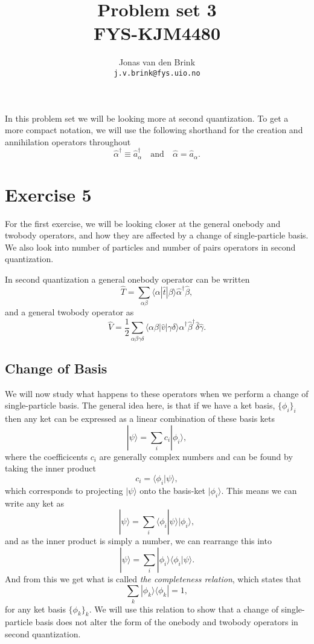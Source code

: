 \documentclass[a4paper, 11pt, notitlepage, english]{article}
\author{Jonas van den Brink \\ \texttt{j.v.brink@fys.uio.no}}
\title{Problem set 3 \\ FYS-KJM4480}
\newcommand{\bra}[1]{\langle #1|}
\newcommand{\ket}[1]{|#1 \rangle}
\newcommand{\braket}[2]{\langle #1 | #2 \rangle}
\newcommand{\op}[1]{\hat{#1}}
\newcommand{\braopket}[3]{\langle #1 | {#2} | #3 \rangle}
\newcommand{\ketbra}[2]{\ket{#1}\bra{#2}}
\begin{document}
\maketitle

In this problem set we will be looking more at second quantization. To get a more compact notation, we will use the following shorthand for the creation and annihilation operators throughout
$$\op{\alpha}^\dag \equiv \op{a}_\alpha^\dag \quad \mbox{and} \quad \op{\alpha} = \op{a}_\alpha.$$

\section*{Exercise 5}
For the first exercise, we will be looking closer at the general onebody and twobody operators, and how they are affected by a change of single-particle basis. We also look into number of particles and number of pairs operators in second quantization.

In second quantization a general onebody operator can be written
$$\op{T} = \sum_{\alpha\beta} \braopket{\alpha}{\op{t}}{\beta} \op{\alpha}^\dag \op{\beta},$$
and a general twobody operator as
$$\op{V} = \frac{1}{2}\sum_{\alpha\beta\gamma\delta} \braopket{\alpha\beta}{\op{v}}{\gamma\delta} \op{\alpha}^\dag \op{\beta}^\dag \op{\delta} \op{\gamma}.$$

\subsection*{Change of Basis}
We will now study what happens to these operators when we perform a change of single-particle basis. The general idea here, is that if we have a ket basis, $\{\phi_i\}_i$ then any ket can be expressed as a linear combination of these basis kets
$$\ket{\psi} = \sum_i c_i \ket{\phi_i},$$
where the coefficicents $c_i$ are generally complex numbers and can be found by taking the inner product 
$$c_i = \braket{\phi_i}{\psi},$$
which corresponds to projecting $\ket{\psi}$ onto the basis-ket $\ket{\phi_i}$. This means we can write any ket as
$$\ket{\psi} = \sum_i  \braket{\phi_i}{\psi}\ket{\phi_i},$$
and as the inner product is simply a number, we can rearrange this into
$$\ket{\psi} = \sum_i  \ket{\phi_i}\braket{\phi_i}{\psi}.$$
And from this we get what is called \emph{the completeness relation}, which states that 
$$\sum_k \ketbra{\phi_k}{\phi_k} = 1,$$
for any ket basis $\{\phi_k\}_k$. We will use this relation to show that a change of single-particle basis does not alter the form of the onebody and twobody operators in second quantization.
\end{document}
